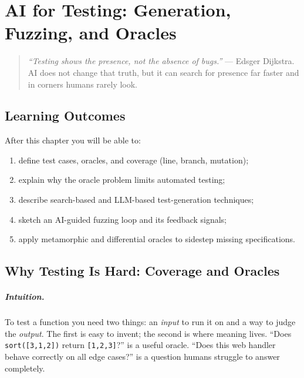 \chapter{AI for Testing: Generation, Fuzzing, and Oracles}
\label{ch:testing}
\sloppy

\begin{quote}
\emph{``Testing shows the presence, not the absence of bugs.''} --- Edsger Dijkstra. AI does not change that truth, but it can search for presence far faster and in corners humans rarely look.
\end{quote}

\noindent{}
\vspace{0.4em}

\section*{Learning Outcomes}
After this chapter you will be able to:
\begin{enumerate}[label=(L\arabic*)]
    \item define test cases, oracles, and coverage (line, branch, mutation);
    \item explain why the oracle problem limits automated testing;
    \item describe search-based and LLM-based test-generation techniques;
    \item sketch an AI-guided fuzzing loop and its feedback signals;
    \item apply metamorphic and differential oracles to sidestep missing specifications.
\end{enumerate}

\section{Why Testing Is Hard: Coverage and Oracles}
\label{sec:why-testing-hard}
\paragraph{Intuition.} To test a function you need two things: an \emph{input} to run it on and a way to judge the \emph{output}. The first is easy to invent; the second is where meaning lives. ``Does \texttt{sort([3,1,2])} return \texttt{[1,2,3]}?'' is a useful oracle. ``Does this web handler behave correctly on all edge cases?'' is a question humans struggle to answer completely.

